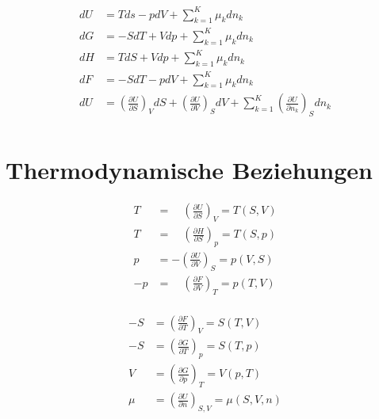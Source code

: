 \documentclass[twocolumn]{article}
\begin{document}
\begin{align*}
	dU &=  Tds - pdV + \sum_{k=1}^{K} \mu_k dn_k \\
	dG &= -SdT + Vdp + \sum_{k=1}^{K} \mu_k dn_k \\ dH &=  TdS + Vdp + \sum_{k=1}^{K} \mu_k dn_k \\
	dF &= -SdT - pdV + \sum_{k=1}^{K} \mu_k dn_k \\
	dU &= 	\left(\frac{\partial U}{\partial S}\right)_{V} dS 
	+ 	\left(\frac{\partial U}{\partial V}\right)_{S} dV 
	+ 	\sum_{k=1}^{K} \left(\frac{\partial U}{\partial n_k}\right)_{S} dn_k  \\
\end{align*}


\section{Thermodynamische Beziehungen}

\begin{multicols}{2}

\begin{align*}
	T   	&= \quad \left(\frac{\partial U}{\partial S}\right)_{V} = T(S,V)  	\\
	T   	&= \quad \left(\frac{\partial H}{\partial S}\right)_{p} = T(S,p)  	\\
	p   	&= -\left(\frac{\partial U}{\partial V}\right)_{S} = p(V,S)	      	\\
	-p  	&= \quad \left(\frac{\partial F}{\partial V}\right)_{T} = p(T,V)	\\
\end{align*}

\begin{align*}
	-S 	&= \left(\frac{\partial F}{\partial T}\right)_{V} = S(T,V)		\\
	-S 	&= \left(\frac{\partial G}{\partial T}\right)_{p} = S(T,p)		\\
	 V 	&= \left(\frac{\partial G}{\partial p}\right)_{T} = V(p,T)		\\
	\mu 	&= \left(\frac{\partial U}{\partial n}\right)_{S,V} = \mu(S,V,n)	\\
\end{align*}
\end{multicols}
\end{document}
